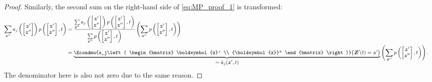 \begin{proof}
    Similarly, the second sum on the right-hand side of \eqref{eq:MP_proof_1} is transformed:
    \begin{align*}
        \sum_{{\boldsymbol{z}}'' } a_j \left( \begin{bmatrix} \boldsymbol{z}' \\ {\boldsymbol{z}}'' \end{bmatrix} \right) p \left( \begin{bmatrix} \boldsymbol{z}' \\ {\boldsymbol{z}}'' \end{bmatrix} , t \right) 
        &= \frac{\sum\limits_{{\boldsymbol{z}}'' } a_j\left( \begin{bmatrix} \boldsymbol{z}' \\ {\boldsymbol{z}}'' \end{bmatrix} \right) p\left( \begin{bmatrix} \boldsymbol{z}' \\ {\boldsymbol{z}}'' \end{bmatrix}, t \right)}{\sum\limits_{{\boldsymbol{z}}'' } p\left( \begin{bmatrix} \boldsymbol{z}' \\ {\boldsymbol{z}}'' \end{bmatrix}, t \right)} \left( \sum_{{\boldsymbol{z}}'' } p\left( \begin{bmatrix} \boldsymbol{z}' \\ {\boldsymbol{z}}'' \end{bmatrix}, t \right) \right) \\
        &=  \underbrace{ \Econdmu{a_j\left( \begin{bmatrix} \boldsymbol{z}' \\ {\boldsymbol{z}}'' \end{bmatrix} \right)}{\boldsymbol{Z}'(t) = \boldsymbol{z}' } }_{\textstyle = \bar{a}_j (\boldsymbol{z}', t)} \left( \sum_{{\boldsymbol{z}}'' } p\left( \begin{bmatrix} \boldsymbol{z}' \\ {\boldsymbol{z}}'' \end{bmatrix}, t \right) \right).
    \end{align*}
    The denominator here is also not zero due to the same reason.
    

\end{proof}
